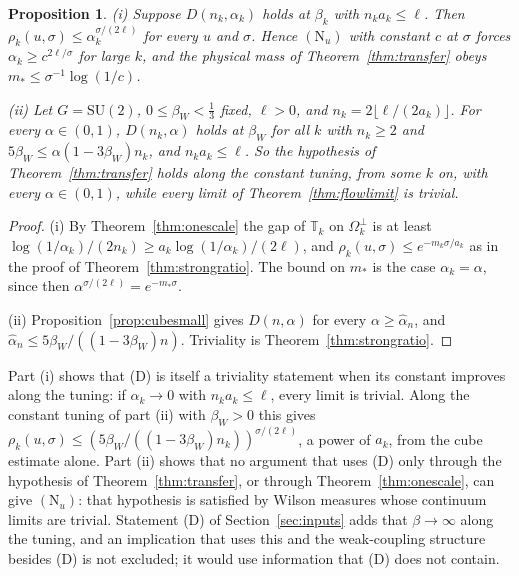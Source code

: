 \documentclass[11pt]{amsart}
\newtheorem{proposition}[theorem]{Proposition}
\theoremstyle{definition}
\theoremstyle{remark}
\numberwithin{equation}{section}
\newcommand{\SU}{\mathrm{SU}}
\begin{document}
\begin{proposition}\label{prop:cubecompatible}
\textup{(i)} Suppose $D(n_k,\alpha_k)$ holds at $\beta_k$ with $n_ka_k\le\ell$.
Then $\rho_k(u,\sigma)\le\alpha_k^{\sigma/(2\ell)}$ for every $u$ and
$\sigma$. Hence $(\mathrm N_u)$ with constant $c$ at $\sigma$ forces
$\alpha_k\ge c^{2\ell/\sigma}$ for large $k$, and the physical mass of
Theorem~\textup{\ref{thm:transfer}} obeys $m_*\le\sigma^{-1}\log(1/c)$.

\textup{(ii)} Let $G=\SU(2)$, $0\le\beta_W<\frac13$ fixed, $\ell>0$, and
$n_k=2\lfloor\ell/(2a_k)\rfloor$. For every $\alpha\in(0,1)$, $D(n_k,\alpha)$
holds at $\beta_W$ for all $k$ with $n_k\ge2$ and
$5\beta_W\le\alpha(1-3\beta_W)n_k$, and $n_ka_k\le\ell$. So the hypothesis of
Theorem~\textup{\ref{thm:transfer}} holds along the constant tuning, from
some $k$ on, with every $\alpha\in(0,1)$, while every limit of
Theorem~\textup{\ref{thm:flowlimit}} is trivial.
\end{proposition}

\begin{proof}
(i) By Theorem~\ref{thm:onescale} the gap of $\mathbb T_k$ on
$\Omega_k^\perp$ is at least $\log(1/\alpha_k)/(2n_k)\ge a_k\log(1/\alpha_k)
/(2\ell)$, and $\rho_k(u,\sigma)\le e^{-m_k\sigma/a_k}$ as in the proof of
Theorem~\ref{thm:strongratio}. The bound on $m_*$ is the case $\alpha_k=
\alpha$, since then $\alpha^{\sigma/(2\ell)}=e^{-m_*\sigma}$.

(ii) Proposition~\ref{prop:cubesmall} gives $D(n,\alpha)$ for every
$\alpha\ge\hat\alpha_n$, and $\hat\alpha_n\le5\beta_W/((1-3\beta_W)n)$.
Triviality is Theorem~\ref{thm:strongratio}.
\end{proof}

Part (i) shows that (D) is itself a triviality statement when its constant
improves along the tuning: if $\alpha_k\to0$ with $n_ka_k\le\ell$, every limit
is trivial. Along the constant tuning of part (ii) with $\beta_W>0$ this gives
$\rho_k(u,\sigma)\le(5\beta_W/((1-3\beta_W)n_k))^{\sigma/(2\ell)}$, a power of
$a_k$, from the cube estimate alone. Part (ii) shows that no argument that
uses (D) only through the hypothesis of Theorem~\ref{thm:transfer}, or through
Theorem~\ref{thm:onescale}, can give $(\mathrm N_u)$: that hypothesis is
satisfied by Wilson measures whose continuum limits are trivial. Statement
(D) of Section~\ref{sec:inputs} adds that $\beta\to\infty$ along the tuning, and an
implication that uses this and the weak-coupling structure besides (D) is not
excluded; it would use information that (D) does not contain.
\end{document}
